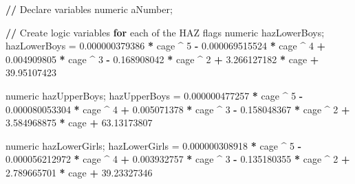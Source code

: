 \documentclass[12pt,a4paper]{article}
\newenvironment{Shaded}{\begin{snugshade}}{\end{snugshade}}
\newcommand{\DecValTok}[1]{\textcolor[rgb]{0.00,0.00,0.81}{#1}}
\newcommand{\FloatTok}[1]{\textcolor[rgb]{0.00,0.00,0.81}{#1}}
\newcommand{\StringTok}[1]{\textcolor[rgb]{0.31,0.60,0.02}{#1}}
\newcommand{\ControlFlowTok}[1]{\textcolor[rgb]{0.13,0.29,0.53}{\textbf{#1}}}
\newcommand{\OperatorTok}[1]{\textcolor[rgb]{0.81,0.36,0.00}{\textbf{#1}}}
\newcommand{\ErrorTok}[1]{\textcolor[rgb]{0.64,0.00,0.00}{\textbf{#1}}}
\newcommand{\NormalTok}[1]{#1}
\theoremstyle{definition}
\theoremstyle{definition}
\theoremstyle{definition}
\theoremstyle{remark}
\begin{document}
\begin{Shaded}
\begin{Highlighting}[]
\OperatorTok{/}\ErrorTok{/}\StringTok{ }\NormalTok{Declare variables}
\NormalTok{numeric aNumber;}

\OperatorTok{/}\ErrorTok{/}\StringTok{ }\NormalTok{Create logic variables }\ControlFlowTok{for}\NormalTok{ each of the HAZ flags}
\NormalTok{numeric hazLowerBoys;}
\NormalTok{hazLowerBoys =}\StringTok{ }\FloatTok{0.000000379386} \OperatorTok{*}\StringTok{ }\NormalTok{cage }\OperatorTok{^}\StringTok{ }\DecValTok{5} \OperatorTok{-}\StringTok{ }\FloatTok{0.000069515524} \OperatorTok{*}\StringTok{ }\NormalTok{cage }\OperatorTok{^}\StringTok{ }\DecValTok{4} 
               \OperatorTok{+}\StringTok{ }\FloatTok{0.004909805} \OperatorTok{*}\StringTok{ }\NormalTok{cage }\OperatorTok{^}\StringTok{ }\DecValTok{3} \OperatorTok{-}\StringTok{ }\FloatTok{0.168908042} \OperatorTok{*}\StringTok{ }\NormalTok{cage }\OperatorTok{^}\StringTok{ }\DecValTok{2} 
               \OperatorTok{+}\StringTok{ }\FloatTok{3.266127182} \OperatorTok{*}\StringTok{ }\NormalTok{cage }\OperatorTok{+}\StringTok{ }\FloatTok{39.95107423}

\NormalTok{numeric hazUpperBoys;}
\NormalTok{hazUpperBoys =}\StringTok{ }\FloatTok{0.000000477257} \OperatorTok{*}\StringTok{ }\NormalTok{cage }\OperatorTok{^}\StringTok{ }\DecValTok{5} \OperatorTok{-}\StringTok{ }\FloatTok{0.000080053304} \OperatorTok{*}\StringTok{ }\NormalTok{cage }\OperatorTok{^}\StringTok{ }\DecValTok{4} 
               \OperatorTok{+}\StringTok{ }\FloatTok{0.005071378} \OperatorTok{*}\StringTok{ }\NormalTok{cage }\OperatorTok{^}\StringTok{ }\DecValTok{3} \OperatorTok{-}\StringTok{ }\FloatTok{0.158048367} \OperatorTok{*}\StringTok{ }\NormalTok{cage }\OperatorTok{^}\StringTok{ }\DecValTok{2} 
               \OperatorTok{+}\StringTok{ }\FloatTok{3.584968875} \OperatorTok{*}\StringTok{ }\NormalTok{cage }\OperatorTok{+}\StringTok{ }\FloatTok{63.13173807}

\NormalTok{numeric hazLowerGirls;}
\NormalTok{hazLowerGirls =}\StringTok{ }\FloatTok{0.000000308918} \OperatorTok{*}\StringTok{ }\NormalTok{cage }\OperatorTok{^}\StringTok{ }\DecValTok{5} \OperatorTok{-}\StringTok{ }\FloatTok{0.000056212972} \OperatorTok{*}\StringTok{ }\NormalTok{cage }\OperatorTok{^}\StringTok{ }\DecValTok{4}
                \OperatorTok{+}\StringTok{ }\FloatTok{0.003932757} \OperatorTok{*}\StringTok{ }\NormalTok{cage }\OperatorTok{^}\StringTok{ }\DecValTok{3} \OperatorTok{-}\StringTok{ }\FloatTok{0.135180355} \OperatorTok{*}\StringTok{ }\NormalTok{cage }\OperatorTok{^}\StringTok{ }\DecValTok{2}
                \OperatorTok{+}\StringTok{ }\FloatTok{2.789665701} \OperatorTok{*}\StringTok{ }\NormalTok{cage }\OperatorTok{+}\StringTok{ }\FloatTok{39.23327346}


\end{Highlighting}
\end{Shaded}
\end{document}
